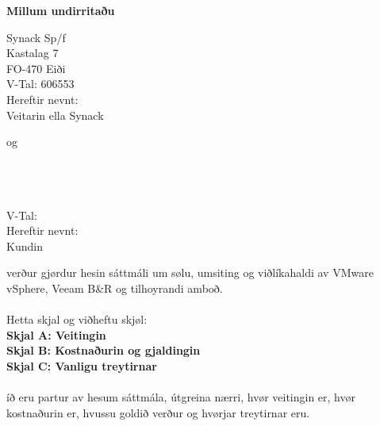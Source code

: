 \begin{titlepage}
	\vspace*{-20mm} \large
\author{Heðin Ejdesgaard Møller}
\thispagestyle{SYNACKSALEFOOTER}
\vspace{25mm}
\begin{center}
	\textbf{Millum undirritaðu}
\end{center}
\begin{minipage}{0.32\textwidth}
	\begin{center}
	  	Synack Sp/f		\\
	  	Kastalag 7		\\
	  	FO-470 Eiði		\\
	  	V-Tal: 606553	\\ \vspace{3mm}
	  	Hereftir nevnt:	\\ Veitarin ella Synack
	\end{center}
\end{minipage}
\begin{minipage}{0.32\textwidth}
	\begin{center}
		og
	\end{center}
\end{minipage}
\begin{minipage}{0.32\textwidth}
	\begin{center}
	   	\Kunden\KundenPf			\\
	   	\KundenAddr		\\
	   	\KundenPost		\\
	   	V-Tal: \KundenVTAL		\\ \vspace{3mm}
	   	Hereftir nevnt:\\ Kundin
	\end{center}
\end{minipage}

\vspace{25mm} 
\noindent
verður gjørdur hesin sáttmáli um sølu, umsiting og viðlíkahaldi av VMware vSphere, Veeam B\&R og tilhoyrandi amboð. \\ \\
Hetta skjal og viðheftu skjøl: \\
\textbf{Skjal A: Veitingin} \\
\textbf{Skjal B: Kostnaðurin og gjaldingin} \\
\textbf{Skjal C: Vanligu treytirnar} \\ \\
íð eru partur av hesum sáttmála, útgreina nærri, hvør veitingin er, hvør kostnaðurin er, hvussu  goldið verður og hvørjar treytirnar eru. \\ \vspace*{15mm}


\end{titlepage}
